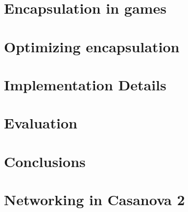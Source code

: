 \documentclass[conference]{IEEEtran}
\begin{document}
\section{Encapsulation in games}
\label{sec:the_problem}



\section{Optimizing encapsulation}
\label{sec:idea}

 
\section{Implementation Details}
\label{sec:details}


\section{Evaluation}
\label{sec:evaluation}


\section{Conclusions}
\label{sec:conclusions_and_future_works}


\section{Networking in Casanova 2}
\label{sec:networking}










\end{document}
